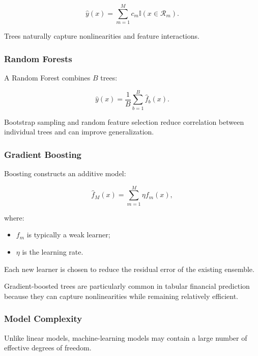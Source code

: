 \documentclass[11pt,a4paper]{article}
\begin{document}
\begin{equation}
\widehat{y}(x)
=
\sum_{m=1}^{M}
c_m
\mathbb{I}
\left(
x\in\mathcal{R}_m
\right).
\end{equation}

Trees naturally capture nonlinearities and feature interactions.


\subsubsection{Random Forests}

A Random Forest combines $B$ trees:

\begin{equation}
\boxed{
\widehat{y}(x)
=
\frac{1}{B}
\sum_{b=1}^{B}
\widehat{f}_b(x).
}
\end{equation}

Bootstrap sampling and random feature selection reduce correlation between
individual trees and can improve generalization.


\subsubsection{Gradient Boosting}

Boosting constructs an additive model:

\begin{equation}
\boxed{
\widehat{f}_M(x)
=
\sum_{m=1}^{M}
\eta
f_m(x),
}
\end{equation}

where:

\begin{itemize}
    \item $f_m$ is typically a weak learner;
    \item $\eta$ is the learning rate.
\end{itemize}

Each new learner is chosen to reduce the residual error of the existing
ensemble.

Gradient-boosted trees are particularly common in tabular financial prediction
because they can capture nonlinearities while remaining relatively efficient.


\subsubsection{Model Complexity}

Unlike linear models, machine-learning models may contain a large number of
effective degrees of freedom.
\end{document}
